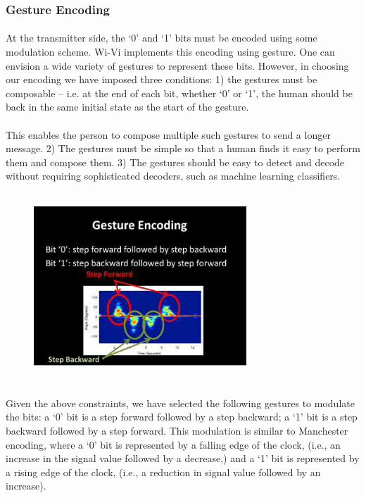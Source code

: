 \documentclass[a4paper,12pt,oneside]{article}
\begin{document}
\subsubsection{Gesture Encoding}
\paragraph{}
At the transmitter side, the ‘0’ and ‘1’ bits must be encoded using some modulation
scheme. Wi-Vi implements this encoding using gesture. One can envision a wide variety of
gestures to represent these bits. However, in choosing our encoding we have imposed three
conditions: 1) the gestures must be composable – i.e. at the end of each bit, whether ‘0’ or ‘1’,
the human should be back in the same initial state as the start of the gesture.
\paragraph{}
This enables the person to compose multiple such gestures to send a longer message. 2)
The gestures must be simple so that a human finds it easy to perform them and compose them. 3)
The gestures should be easy to detect and decode without requiring sophisticated decoders, such
as machine learning classifiers.

\begin{figure}[H]
\centering
\includegraphics[height=7cm,width=8cm]{13.png}
\end{figure}

\paragraph{}
Given the above constraints, we have selected the following gestures to modulate the bits:
a ‘0’ bit is a step forward followed by a step backward; a ‘1’ bit is a step backward followed by a
step forward. This modulation is similar to Manchester encoding, where a ‘0’ bit is represented
by a falling edge of the clock, (i.e., an increase in the signal value followed by a decrease,) and a
‘1’ bit is represented by a rising edge of the clock, (i.e., a reduction in signal value followed by
an increase).
\end{document}
